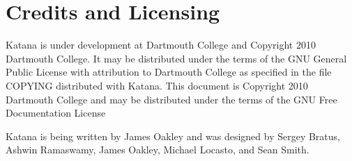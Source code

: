 \documentclass[11pt]{article}
\begin{document}
\section{Credits and Licensing}
\label{sec-11}

  Katana is under development at Dartmouth College and Copyright 2010
  Dartmouth College. It may be distributed under the terms of the GNU
  General Public License with attribution to Dartmouth College as
  specified in the file COPYING distributed with Katana. This document
  is Copyright 2010 Dartmouth College and may be distributed under the
  terms of the GNU Free Documentation License

  Katana is being written by James Oakley and was designed
  by Sergey Bratus, Ashwin Ramaswamy, James Oakley, Michael Locasto,
  and Sean Smith.
\end{document}
